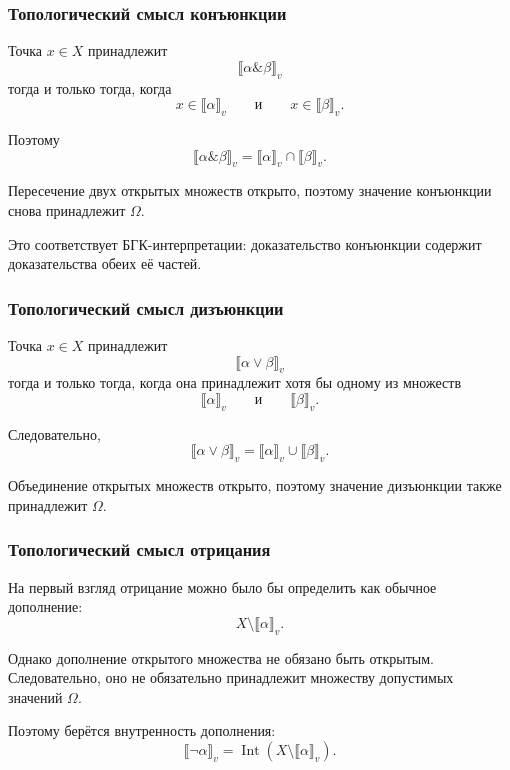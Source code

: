 \documentclass[12pt,a4paper,oneside,openany]{book}
\theoremstyle{definition}
\theoremstyle{plain}
\theoremstyle{remark}
\begin{document}
\subsubsection{Топологический смысл конъюнкции}

Точка \(x\in X\) принадлежит
\[
\llbracket
\alpha\mathbin{\&}\beta
\rrbracket_v
\]
тогда и только тогда, когда
\[
x\in\llbracket\alpha\rrbracket_v
\qquad\text{и}\qquad
x\in\llbracket\beta\rrbracket_v.
\]

Поэтому
\[
\llbracket
\alpha\mathbin{\&}\beta
\rrbracket_v
=
\llbracket\alpha\rrbracket_v
\cap
\llbracket\beta\rrbracket_v.
\]

Пересечение двух открытых множеств открыто, поэтому значение
конъюнкции снова принадлежит \(\Omega\).

Это соответствует БГК-интерпретации: доказательство конъюнкции
содержит доказательства обеих её частей.

\subsubsection{Топологический смысл дизъюнкции}

Точка \(x\in X\) принадлежит
\[
\llbracket\alpha\lor\beta\rrbracket_v
\]
тогда и только тогда, когда она принадлежит хотя бы одному из
множеств
\[
\llbracket\alpha\rrbracket_v
\qquad\text{и}\qquad
\llbracket\beta\rrbracket_v.
\]

Следовательно,
\[
\llbracket
\alpha\lor\beta
\rrbracket_v
=
\llbracket\alpha\rrbracket_v
\cup
\llbracket\beta\rrbracket_v.
\]

Объединение открытых множеств открыто, поэтому значение дизъюнкции
также принадлежит \(\Omega\).



\subsubsection{Топологический смысл отрицания}

На первый взгляд отрицание можно было бы определить как обычное
дополнение:
\[
X\setminus\llbracket\alpha\rrbracket_v.
\]

Однако дополнение открытого множества не обязано быть открытым.
Следовательно, оно не обязательно принадлежит множеству допустимых
значений \(\Omega\).

Поэтому берётся внутренность дополнения:
\[
\llbracket\neg\alpha\rrbracket_v
=
\operatorname{Int}
\left(
X\setminus\llbracket\alpha\rrbracket_v
\right).
\]
\end{document}
